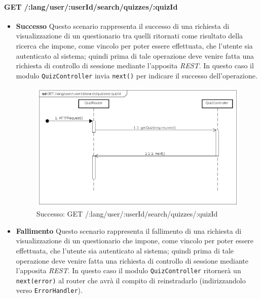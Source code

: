 \paragraph{GET /:lang/user/:userId/search/quizzes/:quizId}
\begin{itemize}
\item \textbf{Successo}
Questo scenario rappresenta il successo di una richiesta di visualizzazione di un questionario tra quelli ritornati come risultato della ricerca che impone, come vincolo per poter essere effettuata, che l'utente sia autenticato al sistema; quindi prima di tale operazione deve venire fatta una richiesta di controllo di sessione mediante l'apposita \textit{REST}. In questo caso il modulo \texttt{QuizController} invia \texttt{next()} per indicare il successo dell'operazione.

\begin{figure}[ht]
	\centering
	\includegraphics[scale=0.45]{UML/DiagrammiDiSequenza/Back-end/GET__lang_user__userId_search_quizzes__quizId_success.png}
	\caption{Successo: GET /:lang/user/:userId/search/quizzes/:quizId}
\end{figure}
\FloatBarrier

\item \textbf{Fallimento}
Questo scenario rappresenta il fallimento di una richiesta di visualizzazione di un questionario che impone, come vincolo per poter essere effettuata, che l'utente sia autenticato al sistema; quindi prima di tale operazione deve venire fatta una richiesta di controllo di sessione mediante l'apposita \textit{REST}. In questo caso il modulo \texttt{QuizController} ritornerà un \texttt{next(error)} al router che avrà il compito di reinstradarlo (indirizzandolo verso \texttt{ErrorHandler}).


\end{itemize}
